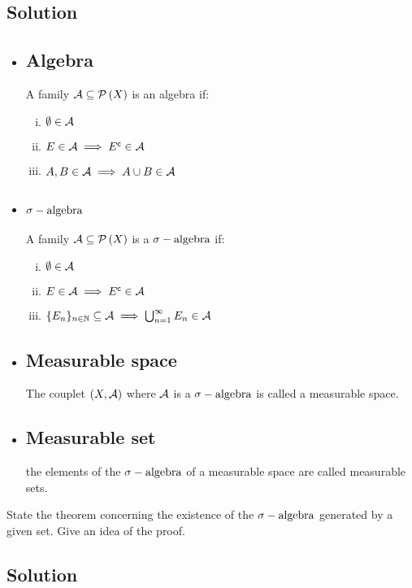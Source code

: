 \subsection*{Solution}
\provdefs
\begin{itemize}
    \item \subsection{Algebra} A family $\mathcal{A}\subseteq\mathcal{P}\left(X\right)$ is an algebra if:
    \begin{enumerate}[i)]
        \item $\emptyset \in \mathcal{A}$
        \item $E\in\mathcal{A} \implies E^{\mathsf{c}} \in\mathcal{A}$
        \item $A,B\in\mathcal{A} \implies A\cup B\in\mathcal{A}$
    \end{enumerate}
    \item \subsection{\texorpdfstring{$\sigma-\text{algebra}$}{TEXT}} A family $\mathcal{A}\subseteq\mathcal{P}\left(X\right)$ is a $\sigma-\text{algebra}$ if:
    \begin{enumerate}[i)]
        \item $\emptyset \in \mathcal{A}$
        \item $E\in\mathcal{A} \implies E^{\mathsf{c}} \in\mathcal{A}$
        \item $\{ E_n \}_{n\in\mathbb{N}} \subseteq\mathcal{A} \implies \bigcup_{n=1}^\infty E_n \in\mathcal{A}$
    \end{enumerate}
    \item \subsection{Measurable space} The couplet $(X,\mathcal{A})$ where $\mathcal{A}$ is a $\sigma-\text{algebra}$ is called a measurable space.
    \item \subsection{Measurable set} the elements of the $\sigma-\text{algebra}$ of a measurable space are called measurable sets.
\end{itemize}


\question
State the theorem concerning the existence of the $\sigma-\text{algebra}$ generated by a given set. Give an
idea of the proof.

\subsection*{Solution}

